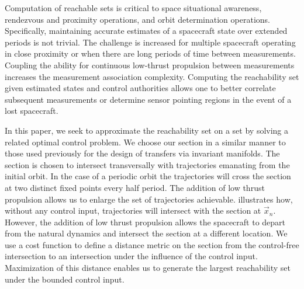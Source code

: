 \documentclass[preprint]{elsarticle}
\begin{document}
Computation of reachable sets is critical to space situational awareness, rendezvous and proximity operations, and orbit determination operations.
Specifically, maintaining accurate estimates of a spacecraft state over extended periods is not trivial.
The challenge is increased for multiple spacecraft operating in close proximity or when there are long periods of time between measurements.
Coupling the ability for continuous low-thrust propulsion between measurements increases the measurement association complexity.
Computing the reachability set given estimated states and control authorities allows one to better correlate subsequent measurements or determine sensor pointing regions in the event of a lost spacecraft. 

In this paper, we seek to approximate the reachability set on a \Poincare set by solving a related optimal control problem. 
We choose our \Poincare section in a similar manner to those used previously for the design of transfers via invariant manifolds.
The \Poincare section is chosen to intersect transversally with trajectories emanating from the initial orbit. 
In the case of a periodic orbit the trajectories will cross the \Poincare section at two distinct fixed points every half period.
The addition of low thrust propulsion allows us to enlarge the set of trajectories achievable. 
 illustrates how, without any control input, trajectories will intersect with the \Poincare section at \( \vec{x}_n \). 
However, the addition of low thrust propulsion allows the spacecraft to depart from the natural dynamics and intersect the \Poincare section at a different location.
We use a cost function to define a distance metric on the \Poincare section from the control-free intersection to an intersection under the influence of the control input.
Maximization of this distance enables us to generate the largest reachability set under the bounded control input.
\end{document}
